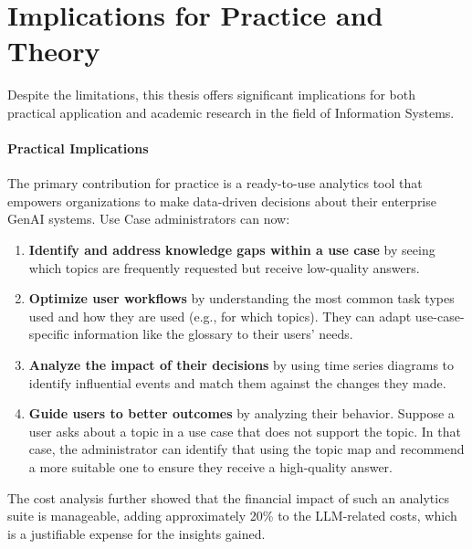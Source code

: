 \documentclass[
	english,
	ruledheaders=section,%
	class=report,%
	thesis={type=bachelor},%
	accentcolor=1b,%
	custommargins=true,%
	marginpar=false,%
	parskip=half-,%
	fontsize=11pt,%
	DIV=14,
]{tudapub}
\begin{document}
\section{Implications for Practice and Theory}
Despite the limitations, this thesis offers significant implications for both practical application and academic research in the field of Information Systems.

\paragraph{Practical Implications} The primary contribution for practice is a ready-to-use analytics tool that empowers organizations to make data-driven decisions about their enterprise GenAI systems. Use Case administrators can now:
\begin{enumerate}
    \item \textbf{Identify and address knowledge gaps within a use case} by seeing which topics are frequently requested but receive low-quality answers.
    \item \textbf{Optimize user workflows} by understanding the most common task types used and how they are used (e.g., for which topics). They can adapt use-case-specific information like the glossary to their users' needs.
    \item \textbf{Analyze the impact of their decisions} by using time series diagrams to identify influential events and match them against the changes they made.
    \item \textbf{Guide users to better outcomes} by analyzing their behavior. Suppose a user asks about a topic in a use case that does not support the topic. In that case, the administrator can identify that using the topic map and recommend a more suitable one to ensure they receive a high-quality answer.
\end{enumerate}
The cost analysis further showed that the financial impact of such an analytics suite is manageable, adding approximately 20\% to the LLM-related costs, which is a justifiable expense for the insights gained.
\end{document}
